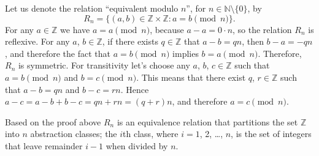 \exercise
Let us denote the relation ``equivalent modulo $n$'', for $n\in\mathbb{N}\setminus\{0\}$, by
\[
    R_n = \{(a,b)\in\mathbb{Z}\times\mathbb{Z}: a=b\!\!\!\pmod{n}\}.
\]
For any $a\in\mathbb{Z}$ we have $a=a\pmod{n}$, because $a-a=0\cdot n$, so the relation $R_n$ is reflexive.
For any $a$, $b\in\mathbb{Z}$, if there exists $q\in\mathbb{Z}$ that $a-b=qn$, then $b-a=-qn$, and therefore the fact that $a=b\pmod{n}$ implies $b=a\pmod{n}$.
Therefore, $R_n$ is symmetric.
For transitivity let's choose any $a$, $b$, $c\in\mathbb{Z}$ such that $a=b\pmod{n}$ and $b=c\pmod{n}$.
This means that there exist $q$, $r\in\mathbb{Z}$ such that $a-b=qn$ and $b-c=rn$.
Hence $a-c=a-b+b-c=qn+rn=(q+r)n$, and therefore $a=c\pmod{n}$.

Based on the proof above $R_n$ is an equivalence relation that partitions the set $\mathbb{Z}$ into $n$ abstraction classes;
the $i$th class, where $i=1$, 2, \dots, $n$, is the set of integers that leave remainder $i-1$ when divided by $n$.
